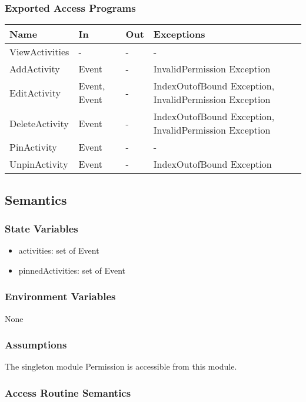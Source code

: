 \documentclass[12pt, titlepage]{article}
\begin{document}
\subsubsection{Exported Access Programs}
\begin{center}
\begin{tabular}{p{4cm} p{2cm} p{4cm} p{4cm}}
\hline
\textbf{Name} & \textbf{In} & \textbf{Out} & \textbf{Exceptions} \\
\hline
ViewActivities & - & - & - \\
AddActivity & Event & - & InvalidPermission Exception \\
EditActivity & Event, Event & - & IndexOutofBound Exception, InvalidPermission Exception \\
DeleteActivity & Event & - & IndexOutofBound Exception, InvalidPermission Exception \\
PinActivity & Event & - & - \\
UnpinActivity & Event & - & IndexOutofBound Exception \\
\hline
\end{tabular}
\end{center}

\subsection{Semantics}

\subsubsection{State Variables}

\begin{itemize}
  \item activities: set of Event
  \item pinnedActivities: set of Event
\end{itemize}

\subsubsection{Environment Variables}

None

\subsubsection{Assumptions}

The singleton module Permission is accessible from this module.

\subsubsection{Access Routine Semantics}
\end{document}
